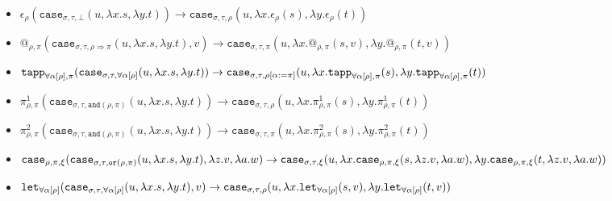 \documentclass[runningheads,a4paper]{llncs}
\newcommand{\quant}[2]{\forall #1[#2]}
\newcommand{\qquant}[3]{#1 #2[#3]}
\newcommand{\arrtype}{\Rightarrow}
\newcommand{\abs}[2]{\lambda #1.#2}
\begin{document}
\begin{itemize}
\item $
\epsilon_\rho(\mathtt{case}_{\sigma,\tau,\bot}(u,\abs{x}{s},\abs{y}{t}))
  \to
  \mathtt{case}_{\sigma,\tau,\rho}(u,\abs{x}{\epsilon_\rho(s)},
  \abs{y}{\epsilon_\rho(t)}) $%
\item $
@_{\rho,\pi}(\mathtt{case}_{\sigma,\tau,\rho \arrtype \pi}(u,
  \abs{x}{s},\abs{y}{t}),v) %
  \to
  \mathtt{case}_{\sigma,\tau,\pi}(u,
  \abs{x}{@_{\rho,\pi}(s,v)},\abs{y}{@_{\rho,\pi}(t,v)}) $%
\item $
\mathtt{tapp}_{\quant{\alpha}{\rho},\pi}(\mathtt{case}_{\sigma,\tau,
  \quant{\alpha}{\rho}}(u,\abs{x}{s},\abs{y}{t})) %
  \to
  \mathtt{case}_{\sigma,\tau,\rho[\alpha:=\pi]}(u,
  \abs{x}{\mathtt{tapp}_{\quant{\alpha}{\rho},\pi}(s)},\\
  \abs{y}{\mathtt{tapp}_{\quant{\alpha}{\rho},\pi}(t)}) $%
\item $
\pi^1_{\rho,\pi}(\mathtt{case}_{\sigma,\tau,\mathtt{and}(\rho,\pi)}(u,
  \abs{x}{s},\abs{y}{t})) %
  \to
  \mathtt{case}_{\sigma,\tau,\rho}(u,\abs{x}{\pi^1_{\rho,\pi}(s)},
  \abs{y}{\pi^1_{\rho,\pi}(t)}) $%
\item $
\pi^2_{\rho,\pi}(\mathtt{case}_{\sigma,\tau,\mathtt{and}(\rho,\pi)}(u,
  \abs{x}{s},\abs{y}{t})) %
  \to
  \mathtt{case}_{\sigma,\tau,\pi}(u,\abs{x}{\pi^2_{\rho,\pi}(s)},
  \abs{y}{\pi^2_{\rho,\pi}(t)}) $%
\item $
\mathtt{case}_{\rho,\pi,\xi}(\mathtt{case}_{\sigma,\tau,\mathtt{or}(
  \rho,\pi)}(u,\abs{x}{s},\abs{y}{t}),\abs{z}{v},\abs{a}{w}) %
  \to\\
  \mathtt{case}_{\sigma,\tau,\xi}(u,
    \abs{x}{\mathtt{case}_{\rho,\pi,\xi}(s,\abs{z}{v},\abs{a}{w})},
    \abs{y}{\mathtt{case}_{\rho,\pi,\xi}(t,\abs{z}{v},\abs{a}{w})}) $%
\item $
\mathtt{let}_{\qquant{\forall}{\alpha}{\rho}}(
  \mathtt{case}_{\sigma,\tau,\qquant{\forall}{\alpha}{\rho}}(
  u,\abs{x}{s},\abs{y}{t}),v) %
  \to\\
  \mathtt{case}_{\sigma,\tau,\rho}(u,
  \abs{x}{\mathtt{let}_{\qquant{\forall}{\alpha}{\rho}}(s,v)},
  \abs{y}{\mathtt{let}_{\qquant{\forall}{\alpha}{\rho}}(t,v)})
  $%
\end{itemize}
\end{document}
